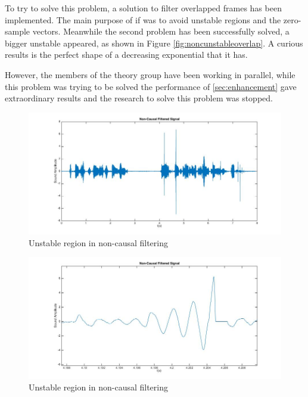\documentclass[11pt,a4paper,english]{book}  %
\theoremstyle{definition}  %
\theoremstyle{plain}  %
\theoremstyle{remark}  %
\begin{document}
		To try to solve this problem, a solution to filter overlapped frames has been implemented. The main purpose of if was to avoid unstable regions and the zero-sample vectors. Meanwhile the second problem has been successfully solved, a bigger unstable appeared, as shown in Figure \ref{fig:noncunstableoverlap}. A curious results is the perfect shape of a decreasing exponential that it has.
		
		However, the members of the theory group have been working in parallel, while this problem was trying to be solved the performance of \ref{sec:enhancement} gave extraordinary results and the research to solve this problem was stopped.
		
	
		
		\begin{figure}[h]
		\centering
		\includegraphics[width=15cm]{images/theory/nonc.jpg}
		\caption{Unstable region in non-causal filtering}
		\label{fig:nonc}
		\end{figure}		
		
		\begin{figure}[h]
		\centering
		\includegraphics[width=15cm]{images/theory/noncunstable.jpg}
		\caption{Unstable region in non-causal filtering}
		\label{fig:noncunstable}
		\end{figure}
		
\end{document}
